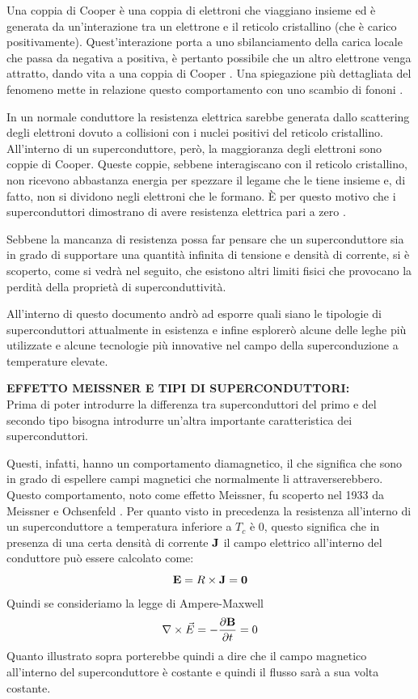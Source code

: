 \documentclass[a4paper,10pt]{article}
\begin{document}
Una coppia di Cooper è una coppia di elettroni che viaggiano insieme ed è generata da
un'interazione tra un elettrone e il reticolo cristallino (che è carico positivamente).
Quest'interazione porta a uno sbilanciamento della carica locale che passa da negativa a positiva, è pertanto possibile che un altro elettrone venga attratto, dando vita a una coppia di
Cooper \cite{cooper-cambridge}. Una spiegazione più dettagliata del fenomeno mette in relazione
questo comportamento con uno scambio di fononi \cite{quantum-springer}.

In un normale conduttore la resistenza elettrica sarebbe generata dallo scattering degli elettroni
dovuto a collisioni con i nuclei positivi del reticolo cristallino. All'interno di un
superconduttore, però, la maggioranza degli elettroni sono coppie di Cooper. Queste coppie, sebbene
interagiscano con il reticolo cristallino, non ricevono abbastanza energia per spezzare il legame
che le tiene insieme e, di fatto, non si dividono negli elettroni che le formano. È per questo motivo che i superconduttori dimostrano di avere resistenza elettrica pari a zero \cite{bcs-cambridge}.

Sebbene la mancanza di resistenza possa far pensare che un superconduttore sia in grado di
supportare una quantità infinita di tensione e densità di corrente, si è scoperto, come si vedrà nel
seguito, che esistono altri limiti fisici che provocano la perdità della proprietà di
superconduttività.

All'interno di questo documento andrò ad esporre quali siano le tipologie di superconduttori
attualmente in esistenza e infine esplorerò alcune delle leghe più utilizzate e alcune tecnologie
più innovative nel campo della superconduzione a temperature elevate.

\bigskip
{}
\label{sec:type-one}
\noindent
\textbf{EFFETTO MEISSNER E TIPI DI SUPERCONDUTTORI:}
\\
Prima di poter introdurre la differenza tra superconduttori del primo e del secondo tipo bisogna
introdurre un'altra importante caratteristica dei superconduttori.

Questi, infatti, hanno un comportamento diamagnetico, il che significa che sono in grado di
espellere campi magnetici che normalmente li attraverserebbero. Questo comportamento, noto come
effetto Meissner, fu scoperto nel 1933 da Meissner e Ochsenfeld \cite{meissner}. Per quanto visto in
precedenza la resistenza all'interno di un superconduttore a temperatura inferiore a $T_c$ è $0$,
questo significa che in presenza di una certa densità di corrente $\mathbf{J}$ il campo elettrico
all'interno del conduttore può essere calcolato come:
\begin{equation}
	\mathbf{E} = R \times \mathbf{J} = \mathbf{0}
\end{equation}
Quindi se consideriamo la legge di Ampere-Maxwell
\begin{equation*}
	\nabla \times \vec{E} = - \frac{\partial{\mathbf{B}}}{\partial{t}} = 0
\end{equation*}
Quanto illustrato sopra porterebbe quindi a dire che il campo magnetico all'interno del
superconduttore è costante e quindi il flusso sarà a sua volta costante.
\end{document}
